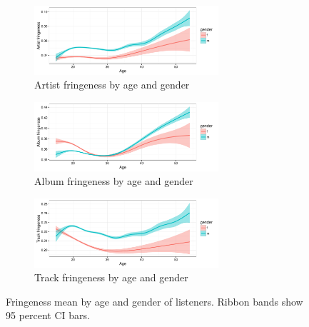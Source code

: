 \graphicspath{{./figs/ch6/}}
\begin{figure}[!t]
	\centering
	\begin{subfigure}[b]{\textwidth}
		\centering
		\includegraphics[width=0.75\textwidth]{artist_fringeness_by_gender.pdf}
        \caption{Artist fringeness by age and gender}
        \label{fig:artist_fringeness_by_age}
	\end{subfigure}

	\begin{subfigure}[b]{\textwidth}
		\centering
		\includegraphics[width=0.75\textwidth]{album_fringeness_by_age_and_gender.pdf}
        \caption{Album fringeness by age and gender}
        \label{fig:album_fringeness_by_age}
	\end{subfigure}

	\begin{subfigure}[b]{\textwidth}
		\centering
		\includegraphics[width=0.75\textwidth]{track_fringeness_by_age_and_gender.pdf}
        \caption{Track fringeness by age and gender}
        \label{fig:track_fringeness_by_age}
	\end{subfigure}

\caption[Fringeness mean by age and gender of listeners]{Fringeness mean by age and gender of listeners. Ribbon bands show 95 percent CI bars.}
\label{fig:fringeness_by_gender}
\end{figure}



